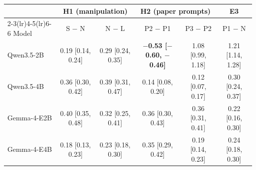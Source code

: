 \begin{tabular}{lccccc}
\toprule
 & \multicolumn{2}{c}{H1 (manipulation)} & \multicolumn{2}{c}{H2 (paper prompts)} & E3 \\
\cmidrule(lr){2-3}\cmidrule(lr){4-5}\cmidrule(lr){6-6}
Model & S $-$ N & N $-$ L & P2 $-$ P1 & P3 $-$ P2 & P1 $-$ N \\
\midrule
Qwen3.5-2B & 0.19 [0.14, 0.24] & 0.29 [0.24, 0.35] & \textbf{$-$0.53 [$-$0.60, $-$0.46]} & 1.08 [0.99, 1.18] & 1.21 [1.14, 1.28] \\
Qwen3.5-4B & 0.36 [0.30, 0.42] & 0.39 [0.31, 0.47] & 0.14 [0.08, 0.20] & 0.12 [0.07, 0.17] & 0.30 [0.24, 0.37] \\
Gemma-4-E2B & 0.40 [0.35, 0.48] & 0.32 [0.25, 0.41] & 0.36 [0.30, 0.43] & 0.36 [0.31, 0.41] & 0.22 [0.16, 0.30] \\
Gemma-4-E4B & 0.18 [0.13, 0.23] & 0.23 [0.18, 0.30] & 0.35 [0.29, 0.42] & 0.19 [0.14, 0.23] & 0.24 [0.18, 0.30] \\
\bottomrule
\end{tabular}
